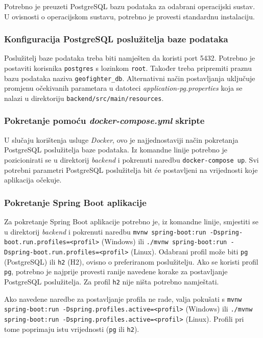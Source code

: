 			 {Potrebno je preuzeti PostgreSQL bazu podataka za odabrani operacijski sustav. U ovisnosti o operacijskom sustavu, potrebno je provesti standardnu instalaciju.}
			 
 			\subsubsection{Konfiguracija PostgreSQL poslužitelja baze podataka}
			 
			 {Poslužitelj baze podataka treba biti namješten da koristi port 5432. Potrebno je postaviti korisnika \texttt{postgres} s lozinkom \texttt{root}. Također treba pripremiti praznu bazu podataka naziva \texttt{geofighter\_db}. Alternativni način postavljanja uključuje promjenu očekivanih parametara u datoteci \textit{application-pg.properties} koja se nalazi u direktoriju \texttt{backend/src/main/resources}.}
			
 			\subsubsection{Pokretanje pomoću \textit{docker-compose.yml} skripte}
			
			{U slučaju korištenja usluge \textit{Docker}, ovo je najjednostaviji način pokretanja PostgreSQL poslužitelja baze podataka. Iz komandne linije potrebno je pozicionirati se u direktorij \textit{backend} i pokrenuti naredbu \texttt{docker-compose up}. Svi potrebni parametri PostgreSQL poslužitelja bit će postavljeni na vrijednosti koje aplikacija očekuje.}
			
 			\subsubsection{Pokretanje Spring Boot aplikacije}
			
			{Za pokretanje Spring Boot aplikacije potrebno je, iz komandne linije, smjestiti se u direktorij \textit{backend} i pokrenuti naredbu \texttt{mvnw spring-boot:run -Dspring-boot.run.profiles=<profil>} (Windows) ili \texttt{./mvnw spring-boot:run -Dspring-boot.run.profiles=<profil>} (Linux). Odabrani profil može biti \texttt{pg} (PostgreSQL) ili \texttt{h2} (H2), ovisno o preferiranom poslužitelju. Ako se koristi profil \texttt{pg}, potrebno je najprije provesti ranije navedene korake za postavljanje PostgreSQL poslužitelja. Za profil \texttt{h2} nije ništa potrebno namještati.} 
			
			{Ako navedene naredbe za postavljanje profila ne rade, valja pokušati s \texttt{mvnw spring-boot:run -Dspring.profiles.active=<profil>} (Windows) ili \texttt{./mvnw spring-boot:run -Dspring.profiles.active=<profil>} (Linux). Profili pri tome poprimaju istu vrijednosti (\texttt{pg} ili \texttt{h2}).} 
			
